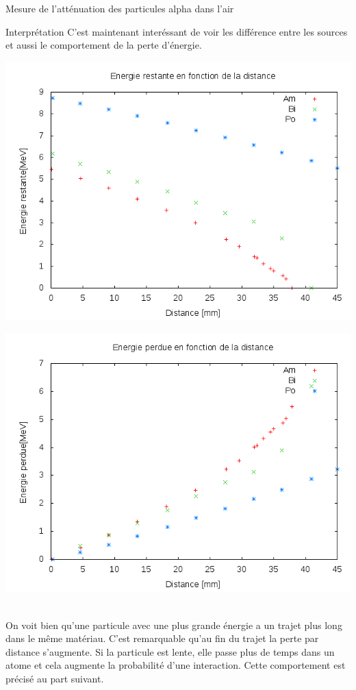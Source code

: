 \documentclass[a4paper,11pt,liststotocnumbered,bibtotocnumbered]{scrartcl}
\begin{document}
\begin{section}{Mesure de l'atténuation des particules alpha dans l'air}
  \begin{subsection}{Interprétation}
   C'est maintenant interéssant de voir les différence entre les sources et aussi le comportement de la perte d'énergie.\\
   \begin{minipage}{0.45\textwidth}
    \includegraphics[width=\textwidth]{Sabine/alle.png}
   \end{minipage}
   \hfill
   \begin{minipage}{0.45\textwidth}
    \includegraphics[width=\textwidth]{Sabine/alle_perte.png}
   \end{minipage} \\

   On voit bien qu'une particule avec une plus grande énergie a un trajet plus long dans le même matériau. C'est remarquable qu'au fin du trajet la perte par distance s'augmente. Si la particule est lente, elle passe plus de temps dans un atome et cela augmente la probabilité d'une interaction. Cette comportement est précisé au part suivant. 
  \end{subsection}
 \end{section}
\end{document}
